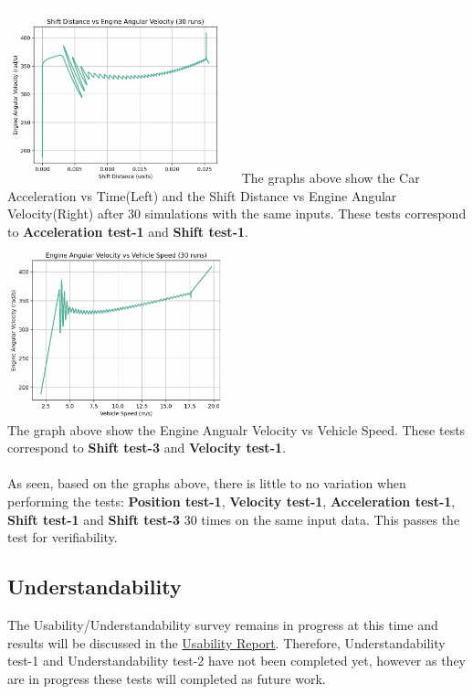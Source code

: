 \documentclass[12pt, titlepage]{article}
\begin{document}
\includegraphics[width=0.5\textwidth]{simulation-figures/shift_distance_vs_engine_velocity30.png}
\noindent The graphs above show the Car Acceleration vs Time(Left) and the Shift Distance vs Engine Angular Velocity(Right) after 30 simulations with the same inputs.
These tests correspond to \textbf{Acceleration test-1} and \textbf{Shift test-1}. \\
\includegraphics[width=0.5\textwidth]{simulation-figures/shift_curve_30.png}
\\
\noindent The graph above show the Engine Angualr Velocity vs Vehicle Speed. 
These tests correspond to \textbf{Shift test-3} and \textbf{Velocity test-1}. \\
\\
As seen, based on the graphs above, there is little to no variation when performing the tests: \textbf{Position test-1}, \textbf{Velocity test-1}, \textbf{Acceleration test-1}, \textbf{Shift test-1} and \textbf{Shift test-3} 30 times on the same input data.
This passes the test for verifiability. 

\subsection{Understandability}
The Usability/Understandability survey remains in progress at this time and results will be discussed in the \href{file:../UsabilityReport/UsabilityReport.pdf}{Usability Report}. 
Therefore, Understandability test-1 and Understandability test-2 have not been completed yet, however as they are in progress these tests will completed as future work. 
\end{document}
